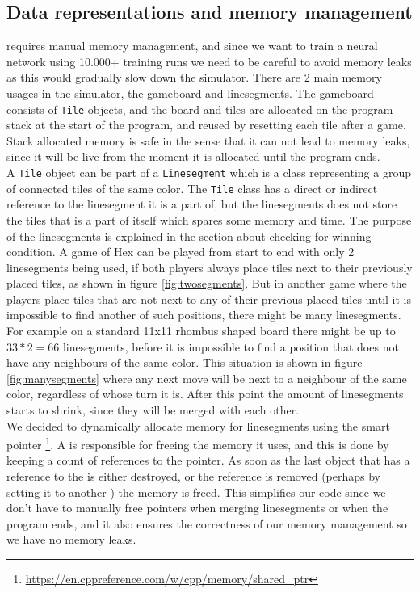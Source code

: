 \documentclass[a4paper]{article}
\begin{document}
\subsection{Data representations and memory management}
\cpp{} requires manual memory management, and since we want to train a neural network using 10.000+ training runs we need to be careful to avoid memory leaks as this would gradually slow down the simulator. There are 2 main memory usages in the simulator, the gameboard and linesegments. The gameboard consists of \texttt{Tile} objects, and the board and tiles are allocated on the program stack at the start of the program, and reused by resetting each tile after a game. Stack allocated memory is safe in the sense that it can not lead to memory leaks, since it will be live from the moment it is allocated until the program ends.\\
A \texttt{Tile} object can be part of a \texttt{Linesegment} which is a class representing a group of connected tiles of the same color. The \texttt{Tile} class has a direct or indirect reference to the linesegment it is a part of, but the linesegments does not store the tiles that is a part of itself which spares some memory and time. The purpose of the linesegments is explained in the section about checking for winning condition. A game of Hex can be played from start to end with only 2 linesegments being used, if both players always place tiles next to their previously placed tiles, as shown in figure \ref{fig:twosegments}. But in another game where the players place tiles that are not next to any of their previous placed tiles until it is impossible to find another of such positions, there might be many linesegments. For example on a standard 11x11 rhombus shaped board there might be up to $33*2=66$ linesegments, before it is impossible to find a position that does not have any neighbours of the same color. This situation is shown in figure \ref{fig:manysegments} where any next move will be next to a neighbour of the same color, regardless of whose turn it is. After this point the amount of linesegments starts to shrink, since they will be merged with each other.\\
We decided to dynamically allocate memory for linesegments using the smart pointer \sharedptr{}\footnote{\url{https://en.cppreference.com/w/cpp/memory/shared_ptr}}. A \sharedptr{} is responsible for freeing the memory it uses, and this is done by keeping a count of references to the pointer. As soon as the last object that has a reference to the \sharedptr{} is either destroyed, or the reference is removed (perhaps by setting it to another \sharedptr{}) the memory is freed. This simplifies our code since we don't have to manually free pointers when merging linesegments or when the program ends, and it also ensures the correctness of our memory management so we have no memory leaks.
\end{document}
